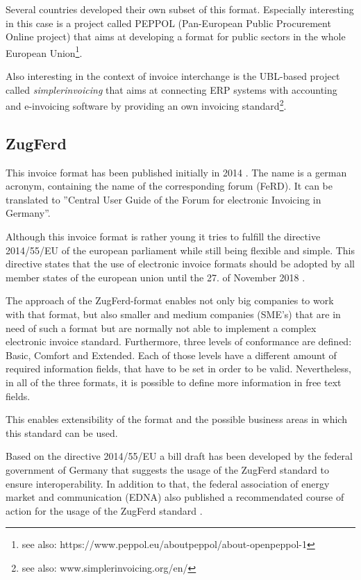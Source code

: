 Several countries developed their own subset of this format. Especially interesting in this case is a project called PEPPOL (Pan-European Public Procurement Online project) that aims at developing a format for public sectors in the whole European Union\footnote {see also: https://www.peppol.eu/about\textunderscore peppol/about-openpeppol-1}. 

Also interesting in the context of invoice interchange is the UBL-based project called \emph{simplerinvoicing} that aims at connecting ERP systems with accounting and e-invoicing software by providing an own invoicing standard\footnote {see also: www.simplerinvoicing.org/en/}. 

\subsection{ZugFerd}
\label{sec2.1.4}

This invoice format has been published initially in 2014 \cite{Ferd14}. The name is a german acronym, containing the name of the corresponding forum (FeRD). It can be translated to ''Central User Guide of the Forum for electronic Invoicing in Germany''. 

Although this invoice format is rather young it tries to fulfill the directive 2014/55/EU of the european parliament \cite{eu14} while still being flexible and simple. This directive states that the use of electronic invoice formats should be adopted by all member states of the european union until the 27. of November 2018 \cite[article 11]{eu14}. 
 
The approach of the ZugFerd-format enables not only big companies to work with that format, but also smaller and medium companies (SME's) that are in need of such a format but are normally not able to implement a complex electronic invoice standard. 
Furthermore, three levels of conformance are defined: Basic, Comfort and Extended. Each of those levels have a different amount of required information fields, that have to be set in order to be valid. Nevertheless, in all of the three formats, it is possible to define more information in free text fields. 

This enables extensibility of the format and the possible business areas in which this standard can be used.

Based on the directive 2014/55/EU \cite{eu14} a bill draft has been developed by the federal government of Germany \cite[page 10]{br16} that suggests the usage of the ZugFerd standard to ensure interoperability. In addition to that, the federal association of energy market and communication (EDNA) also published a recommendated course of action for the usage of the ZugFerd standard \cite{edna16}.


